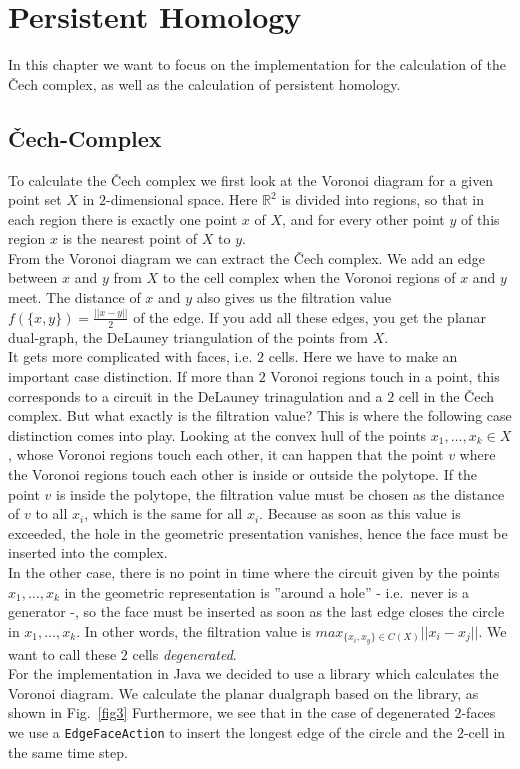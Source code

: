 \documentclass[11pt, a4paper,draft]{report}
\newcommand{\bR}{\mathbb{R}}
\begin{document}
    \chapter{Persistent Homology}\label{ch:persistent-homology}

    In this chapter we want to focus on the implementation for the calculation of the Čech complex, as well as the calculation of persistent homology.

    \section{Čech-Complex}\label{sec:čech-complex}

    To calculate the Čech complex we first look at the Voronoi diagram for a given point set $X$ in $2$-dimensional space.
    Here $\bR^2$ is divided into regions, so that in each region there is exactly one point $x$ of $X$, and for every other point $y$ of this region $x$ is the nearest point of $X$ to $y$.\\
    From the Voronoi diagram we can extract the Čech complex.
    We add an edge between $x$ and $y$ from $X$ to the cell complex when the Voronoi regions of $x$ and $y$ meet.
    The distance of $x$ and $y$ also gives us the filtration value $f(\{x,y\}) = \frac{||x-y||}{2}$ of the edge.
    If you add all these edges, you get the planar dual-graph, the DeLauney triangulation of the points from $X$.\\
    It gets more complicated with faces, i.e. $2$ cells.
    Here we have to make an important case distinction.
    If more than $2$ Voronoi regions touch in a point, this corresponds to a circuit in the DeLauney trinagulation and a $2$ cell in the Čech complex.
    But what exactly is the filtration value?
    This is where the following case distinction comes into play.
    Looking at the convex hull of the points $x_1,\ldots,x_k\in X$, whose Voronoi regions touch each other, it can happen that the point $v$ where the Voronoi regions touch each other is inside or outside the polytope.
    If the point $v$ is inside the polytope, the filtration value must be chosen as the distance of $v$ to all $x_i$, which is the same for all $x_i$.
    Because as soon as this value is exceeded, the hole in the geometric presentation vanishes, hence the face must be inserted into the complex.\\
    
    In the other case, there is no point in time where the circuit given by the points $x_1,\ldots,x_k$ in the geometric representation is ''around a hole'' - i.e.\ never is a generator -, so the face must be inserted as soon as the last edge closes the circle in $x_1,\ldots,x_k$.
    In other words, the filtration value is $max_{\{x_i,x_y\}\in C(X)}||x_i-x_j||$.
    We want to call these $2$ cells \textit{degenerated}.\\
    For the implementation in Java we decided to use a library which calculates the Voronoi diagram.
    We calculate the planar dualgraph based on the library, as shown in Fig.~\ref{fig3} Furthermore, we see that in the case of degenerated $2$-faces we use a \texttt{EdgeFaceAction} to insert the longest edge of the circle and the $2$-cell in the same time step.
\end{document}
